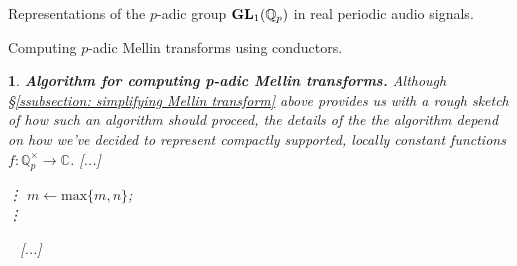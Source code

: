 \documentclass[letterpaper,11pt, reqno]{amsart}
\newtheorem{monodromy theorem}{Monodromy Theorem}[subsection]
\newtheorem{wild conjecture}[theorem]{Wild Conjecture}
\newtheorem{research objectives}{Research objectives}[subsection]
\newtheorem{research question}[theorem]{Research questions}
\newtheorem{aside question}[theorem]{Aside question}
\newtheorem{audio example}[theorem]{\loudspeaker[3] Example}
\newtheorem{blank remark}[theorem]{}
\newtheorem{ssubsection}[theorem]{}
\newtheorem{terminology and comment}[theorem]{Terminology and comment}
\newtheorem{purity hypothesis}[theorem]{Purity hypothesis}
\newtheorem{corollary of the purity hypothesis}[theorem]{Corollary of the purity hypothesis}
\newcommand{\CC} {{\mathbb C}}
\newcommand{\QQ} {{\mathbb Q}}
\newcommand{\lra}{{\longrightarrow}}
\numberwithin{equation}{theorem}
\begin{document}
\begin{section}{Representations of the $p$-adic group $\bold{GL}_{1}(\mathbb{Q}_{p})$
in real periodic audio signals.}
\begin{subsection}{Computing $p$-adic Mellin transforms using conductors.}
\begin{ssubsection}{{\bf Algorithm for computing {\em p}-adic Mellin transforms.}}
\normalfont
Although \S\ref{ssubsection: simplifying Mellin transform} above provides us with a rough sketch of how such an algorithm should proceed, the details of the the algorithm depend on how we've decided to represent compactly supported, locally constant functions $f:\QQ^\times_{p}\lra\CC$.
{\color{red} [...]}
\begin{algorithm}
\caption{Compute $p$-adic Mellin transform $\int_{\QQ^\times_p}
\label{algorithm: Mellin}
f(x)\ \omega(x)\ |x|^{s}_{p}\ d^\times\!x$ as a function of $s\in\CC_{\text{Re}\ge0}$.}
\vdots
$m\longleftarrow \text{max}\{m,n\}$;
\\ 
\vdots
\end{algorithm}

\ 
{\color{red} [...]}

\end{ssubsection}


\end{subsection}
\end{section}
\end{document}
